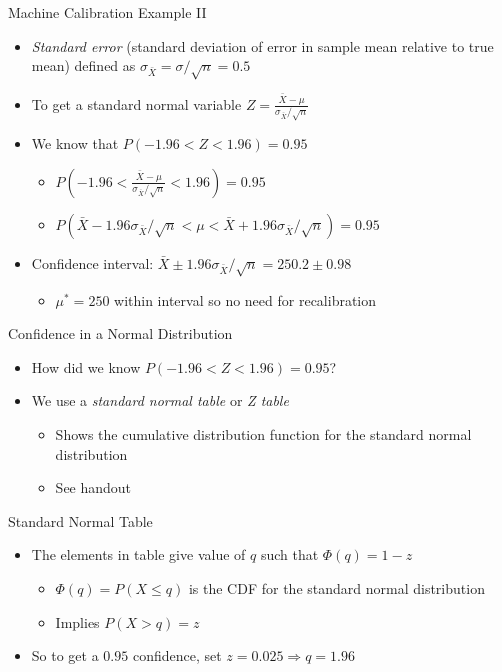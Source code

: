 \documentclass{beamer}
\begin{document}
\begin{frame}{Machine Calibration Example II}  
\begin{itemize} 
 \item \emph{Standard error} (standard deviation of error in sample mean relative to true mean) defined as $\sigma_{\bar{X}} = \sigma/\sqrt{n} = 0.5$ 
 \item To get a standard normal variable $Z = \frac{\bar{X} - \mu}{\sigma_{\bar{X}}/\sqrt{n}}$ 
 \item We know that $P(-1.96 < Z < 1.96) = 0.95$ 
 \begin{itemize}
 \item $P(-1.96 < \frac{\bar{X} - \mu}{\sigma_{\bar{X}}/\sqrt{n}} < 1.96) = 0.95$ 
 \item $P(\bar{X} - 1.96 \sigma_{\bar{X}}/\sqrt{n}  < \mu < \bar{X} + 1.96 \sigma_{\bar{X}}/\sqrt{n}) = 0.95$ 
\end{itemize}
 \item Confidence interval: $\bar{X} \pm 1.96 \sigma_{\bar{X}}/\sqrt{n} = 250.2 \pm 0.98$ 
 \begin{itemize} 
 \item $\mu^* = 250$ within interval so no need for recalibration
 \end{itemize}
\end{itemize}
\end{frame}

\begin{frame}{Confidence in a Normal Distribution}  
\begin{itemize} 
 \item How did we know $P(-1.96 < Z < 1.96) = 0.95$? 
 \item We use a \emph{standard normal table} or \emph{Z table}
 \begin{itemize}
 \item Shows the cumulative distribution function for the standard normal distribution 
 \item See handout 
 \end{itemize} 
\end{itemize}
\end{frame}

\begin{frame}{Standard Normal Table}
\begin{itemize} 
 \item The elements in table give value of $q$ such that $\Phi(q) = 1 - z$ 
 \begin{itemize}
 \item $\Phi(q) = P(X \leq q)$ is the CDF for the standard normal distribution
 \item Implies $P(X > q) = z$
 \end{itemize} 
 \item So to get a $0.95$ confidence, set  $z = 0.025 \Rightarrow q = 1.96$ 
\end{itemize}
\end{frame}
\end{document}
